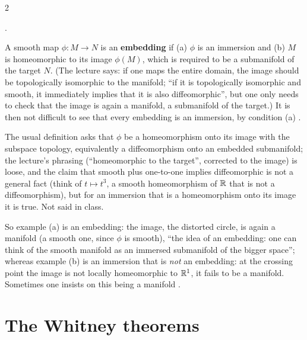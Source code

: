 \begin{paracol}{2}
\begin{example}
\begin{itemize}
\end{itemize}
     .
\end{example}
\begin{definition}\label{def:tb-embedding}
A smooth map $\phi\colon M\to N$ is an \textbf{embedding} if (a) $\phi$ is an immersion and (b) $M$ is homeomorphic to its image $\phi(M)$, which is required to be a submanifold of the target $N$. (The lecture says: if one maps the entire domain, the image should be topologically isomorphic to the manifold; ``if it is topologically isomorphic and smooth,
it immediately implies that it is also diffeomorphic'', but one only needs to check that the image is again a manifold, a submanifold of the target.) It is then not difficult to see that every embedding is an immersion, by condition (a)     .
\end{definition}
\begin{coursenote}
The usual definition asks that $\phi$ be a homeomorphism onto its image with the subspace topology, equivalently a diffeomorphism onto an embedded submanifold; the lecture's phrasing (``homeomorphic to the target'', corrected to the image) is loose, and the claim that smooth plus one-to-one implies diffeomorphic is not a general fact
(think of $t\mapsto t^3$, a smooth homeomorphism of $\mathbb{R}$ that is not a diffeomorphism), but for an immersion that is a homeomorphism onto its image it is true. Not said in class.
\end{coursenote}
So example (a) is an embedding: the image, the distorted circle, is again a manifold (a smooth one, since $\phi$ is smooth), ``the idea of an embedding: one can think of the smooth manifold as an immersed submanifold of the bigger space''; whereas example (b) is an immersion that is \emph{not} an embedding: at the crossing point the image is not locally homeomorphic to $\mathbb{R}^1$, it fails to be a
manifold. Sometimes one insists on this being a manifold     .

\section{The Whitney theorems}\label{sec:tb-whitney}


\end{paracol}

